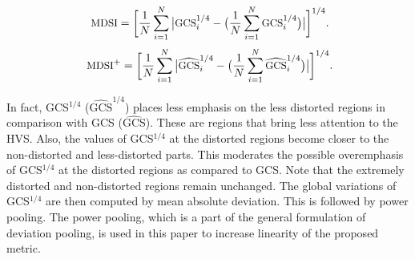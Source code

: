 \begin{equation}
\small
  \ \text{MDSI} = \bigg[ \frac{1}{N} \sum_{i=1}^{N}\big| \text{GCS}_i^{1/4} - \big( \frac{1}{N}\sum_{i=1}^N\text{GCS}_i^{1/4} \big) \big| \bigg]^{1/4}.
  \label{equ:MDSI}
\end{equation}                    
\begin{equation}
\small
  \ \text{MDSI}^+ = \bigg[ \frac{1}{N} \sum_{i=1}^{N}\big| \widehat{\text{GCS}}_i^{1/4} - \big( \frac{1}{N}\sum_{i=1}^N\widehat{\text{GCS}}_i^{1/4} \big) \big| \bigg]^{1/4}.
  \label{equ:MDSIplus}
\end{equation}                    


In fact, GCS$^{1/4}$ ($\widehat{\text{GCS}}^{1/4}$) places less emphasis on the less distorted regions in comparison with GCS ($\widehat{\text{GCS}}$). These are regions that bring less attention to the HVS. Also, the values of GCS$^{1/4}$ at the distorted regions become closer to the non-distorted and less-distorted parts. This moderates the possible overemphasis of GCS$^{1/4}$ at the distorted regions as compared to GCS. Note that the extremely distorted and non-distorted regions remain unchanged. The global variations of GCS$^{1/4}$ are then computed by mean absolute deviation. This is followed by power pooling. The power pooling, which is a part of the general formulation of deviation pooling, is used in this paper to increase linearity of the proposed metric.   






